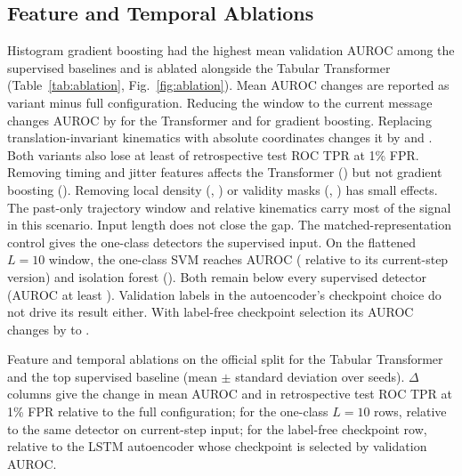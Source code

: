 \documentclass[preprint,12pt,numafflabel]{elsarticle}
\begin{document}
\subsection{Feature and Temporal Ablations}
Histogram gradient boosting had the highest mean validation AUROC among the supervised baselines and is ablated alongside the Tabular Transformer (Table~\ref{tab:ablation}, Fig.~\ref{fig:ablation}). Mean AUROC changes are reported as variant minus full configuration. Reducing the window to the current message changes AUROC by \ResAblWindowTTDelta{} for the Transformer and \ResAblWindowTopDelta{} for gradient boosting. Replacing translation-invariant kinematics with absolute coordinates changes it by \ResAblCoordsTTDelta{} and \ResAblCoordsTopDelta. Both variants also lose at least \ResAblMinTPRLoss{} of retrospective test ROC TPR at 1\% FPR. Removing timing and jitter features affects the Transformer (\ResAblTimingTTDelta) but not gradient boosting (\ResAblTimingTopDelta). Removing local density (\ResAblDensityTTDelta, \ResAblDensityTopDelta) or validity masks (\ResAblMasksTTDelta, \ResAblMasksTopDelta) has small effects. The past-only trajectory window and relative kinematics carry most of the signal in this scenario. Input length does not close the gap. The matched-representation control gives the one-class detectors the supervised input. On the flattened $L=10$ window, the one-class SVM reaches AUROC \ResAblOneClassWindowOneClassSVMTenAUROC{} (\ResAblOneClassWindowOneClassSVMTenDelta{} relative to its current-step version) and isolation forest \ResAblOneClassWindowIsolationForestTenAUROC{} (\ResAblOneClassWindowIsolationForestTenDelta). Both remain below every supervised detector (AUROC at least \ResSupAUROCMin). Validation labels in the autoencoder's checkpoint choice do not drive its result either. With label-free checkpoint selection its AUROC changes by \ResAblAECheckpointLSTMAELabelFreeDelta{} to \ResAblAECheckpointLSTMAELabelFreeAUROC.

\begin{table}
\centering
\caption{Feature and temporal ablations on the official split for the Tabular Transformer and the top supervised baseline (mean $\pm$ standard deviation over seeds). $\Delta$ columns give the change in mean AUROC and in retrospective test ROC TPR at 1\% FPR relative to the full configuration; for the one-class $L=10$ rows, relative to the same detector on current-step input; for the label-free checkpoint row, relative to the LSTM autoencoder whose checkpoint is selected by validation AUROC.}
\label{tab:ablation}
{\footnotesize
\begin{adjustbox}{max width=\textwidth}

\end{adjustbox}}
\end{table}
\end{document}
